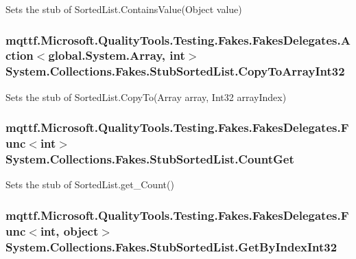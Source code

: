 Sets the stub of Sorted\-List.\-Contains\-Value(\-Object value)

\hypertarget{class_system_1_1_collections_1_1_fakes_1_1_stub_sorted_list_a4772fc53c61d3c01ce084f82739b4bfa}{
\subsubsection[{Copy\-To\-Array\-Int32}]{\setlength{\rightskip}{0pt plus 5cm}mqttf.\-Microsoft.\-Quality\-Tools.\-Testing.\-Fakes.\-Fakes\-Delegates.\-Action$<$global.\-System.\-Array, int$>$ System.\-Collections.\-Fakes.\-Stub\-Sorted\-List.\-Copy\-To\-Array\-Int32}}\label{class_system_1_1_collections_1_1_fakes_1_1_stub_sorted_list_a4772fc53c61d3c01ce084f82739b4bfa}


Sets the stub of Sorted\-List.\-Copy\-To(\-Array array, Int32 array\-Index)

\hypertarget{class_system_1_1_collections_1_1_fakes_1_1_stub_sorted_list_ac46fde0d5dda64d22c9614e416a2de37}{
\subsubsection[{Count\-Get}]{\setlength{\rightskip}{0pt plus 5cm}mqttf.\-Microsoft.\-Quality\-Tools.\-Testing.\-Fakes.\-Fakes\-Delegates.\-Func$<$int$>$ System.\-Collections.\-Fakes.\-Stub\-Sorted\-List.\-Count\-Get}}\label{class_system_1_1_collections_1_1_fakes_1_1_stub_sorted_list_ac46fde0d5dda64d22c9614e416a2de37}


Sets the stub of Sorted\-List.\-get\-\_\-\-Count()

\hypertarget{class_system_1_1_collections_1_1_fakes_1_1_stub_sorted_list_aa62cac2ac90fd154f9fce3f8f9a2945b}{
\subsubsection[{Get\-By\-Index\-Int32}]{\setlength{\rightskip}{0pt plus 5cm}mqttf.\-Microsoft.\-Quality\-Tools.\-Testing.\-Fakes.\-Fakes\-Delegates.\-Func$<$int, object$>$ System.\-Collections.\-Fakes.\-Stub\-Sorted\-List.\-Get\-By\-Index\-Int32}}\label{class_system_1_1_collections_1_1_fakes_1_1_stub_sorted_list_aa62cac2ac90fd154f9fce3f8f9a2945b}


